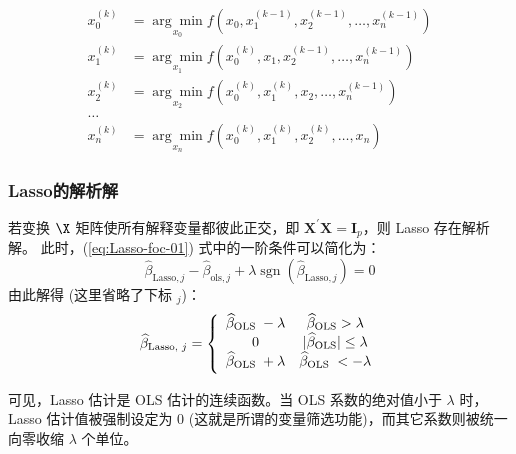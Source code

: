 \begin{equation}
\begin{aligned}
x_0^{(k)} &=\underset{x_0}{\arg \min } f\left(x_0, x_1^{(k-1)}, x_2^{(k-1)}, \ldots, x_n^{(k-1)}\right) \\
x_1^{(k)} &=\underset{x_1}{\arg \min } f\left(x_0^{(k)}, x_1, x_2^{(k-1)}, \ldots, x_n^{(k-1)}\right) \\
x_2^{(k)} &=\underset{x_2}{\arg \min } f\left(x_0^{(k)}, x_1^{(k)}, x_2, \ldots, x_n^{(k-1)}\right) \\
\ldots & \\
x_n^{(k)} &=\underset{x_n}{\arg \min } f\left(x_0^{(k)}, x_1^{(k)}, x_2^{(k)}, \ldots, x_n\right)
\end{aligned}
\end{equation}

\subsubsection{Lasso的解析解}
若变换 $\X$ 矩阵使所有解释变量都彼此正交，即 $\boldsymbol{X}^{\prime} \boldsymbol{X}=\boldsymbol{I}_{p}$，则 Lasso 存在解析解。
此时，(\ref{eq:Lasso-foc-01}) 式中的一阶条件可以简化为：
$$
  \widehat{\beta}_{\mathrm{Lasso}, j}-\widehat{\beta}_{\mathrm{ols}, j} 
  +\lambda \operatorname{sgn}\left(\widehat{\beta}_{\mathrm{Lasso}, j}\right)=0
$$
由此解得 (这里省略了下标 $_j$)：
\begin{equation}\label{eq:Lasso-foc-03}
\widehat{\beta}_{\text {Lasso, } j}=\left\{
\begin{array}{cc}
\widehat{\beta}_{\text {OLS }}-\lambda & \widehat{\beta}_{\text {OLS}}>\lambda \\
0 & |\widehat{\beta}_{\text {OLS}}| \leq \lambda \\ \vspace{3pt}
\widehat{\beta}_{\text {OLS }}+\lambda & \widehat{\beta}_{\text {OLS }}<-\lambda
\end{array}\right.	
\end{equation}

可见，Lasso 估计是 OLS 估计的连续函数。当 OLS 系数的绝对值小于 $\lambda$ 时，Lasso 估计值被强制设定为 0 (这就是所谓的变量筛选功能)，而其它系数则被统一向零收缩 $\lambda$ 个单位。

